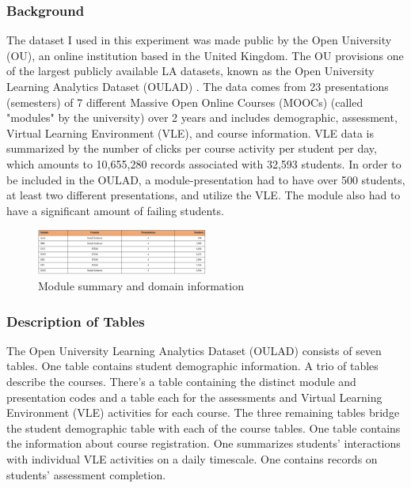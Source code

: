 \documentclass{article}
\begin{document}
        \subsubsection{Background}
            The dataset I used in this experiment was made public by the Open University (OU), an online institution based in the United Kingdom.
            The OU provisions one of the largest publicly available LA datasets, known as the Open University Learning Analytics Dataset (OULAD) \cite{oulad}.
            The data comes from 23 presentations (semesters) of 7 different Massive Open Online Courses (MOOCs) (called "modules" by the university) over 2 years and includes demographic, assessment, Virtual Learning Environment (VLE), and course information.
            VLE data is summarized by the number of clicks per course activity per student per day, which amounts to 10,655,280 records associated with 32,593 students.
            In order to be included in the OULAD, a module-presentation had to have over 500 students, at least two different presentations, and utilize the VLE.
            The module also had to have a significant amount of failing students.

            \begin{figure}
                \includegraphics[width=0.5\textwidth]{oulad_students_courses}
                \caption{Module summary and domain information \cite{oulad}}
                \label{fig:oulad_students_courses}
            \end{figure}

        \subsubsection{Description of Tables}
        
            The Open University Learning Analytics Dataset (OULAD) consists of seven tables.
            One table contains student demographic information. 
            A trio of tables describe the courses. 
            There's a table containing the distinct module and presentation codes and a table each for the assessments and Virtual Learning Environment (VLE) activities for each course.
            The three remaining tables bridge the student demographic table with each of the course tables. 
            One table contains the information about course registration.
            One summarizes students' interactions with individual VLE activities on a daily timescale.
            One contains records on students' assessment completion.
\end{document}
